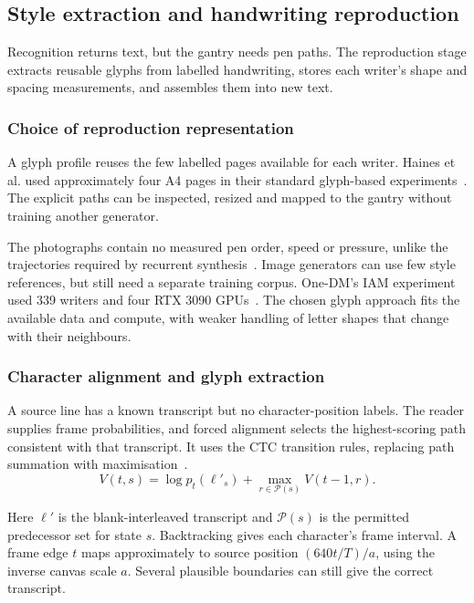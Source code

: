 \subsection{Style extraction and handwriting reproduction}
\label{sec:des-reproduction}
Recognition returns text, but the gantry needs pen paths. The reproduction stage extracts reusable glyphs from labelled handwriting, stores each writer's shape and spacing measurements, and assembles them into new text.

\subsubsection{Choice of reproduction representation}
A glyph profile reuses the few labelled pages available for each writer. Haines et al. used approximately four A4 pages in their standard glyph-based experiments~\cite[p.~4]{haines2016}. The explicit paths can be inspected, resized and mapped to the gantry without training another generator.

The photographs contain no measured pen order, speed or pressure, unlike the trajectories required by recurrent synthesis~\cite[p.~18]{graves2013}. Image generators can use few style references, but still need a separate training corpus. One-DM's IAM experiment used 339 writers and four RTX 3090 GPUs~\cite[p.~9]{dai2024}. The chosen glyph approach fits the available data and compute, with weaker handling of letter shapes that change with their neighbours.

\subsubsection{Character alignment and glyph extraction}
\label{sec:des-alignment}
A source line has a known transcript but no character-position labels. The reader supplies frame probabilities, and forced alignment selects the highest-scoring path consistent with that transcript. It uses the CTC transition rules, replacing path summation with maximisation~\cite[pp.~4--5]{graves2006}.
\begin{equation}
V(t,s)=\log p_t(\ell'_s)+\max_{r\in\mathcal P(s)}V(t-1,r).
\label{eq:des-viterbi}
\end{equation}

Here $\ell'$ is the blank-interleaved transcript and $\mathcal P(s)$ is the permitted predecessor set for state $s$. Backtracking gives each character's frame interval. A frame edge $t$ maps approximately to source position $(640t/T)/a$, using the inverse canvas scale $a$. Several plausible boundaries can still give the correct transcript.

